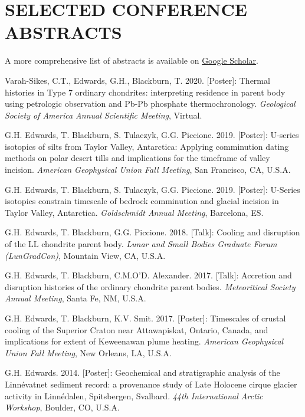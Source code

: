\documentclass[10pt]{article}
\begin{document}

\section*{SELECTED CONFERENCE ABSTRACTS}

\begin{center} A more comprehensive list of abstracts is available on \href{https://scholar.google.com/citations?user=KHLOvgcAAAAJ&hl=en}{Google Scholar}. \end{center}

\begin{etaremune} [itemsep=4pt, leftmargin=3ex]
  \item Varah-Sikes, C.T., Edwards, G.H., Blackburn, T. 2020. [Poster]: Thermal histories in Type 7 ordinary chondrites: interpreting residence in parent body using petrologic observation and Pb-Pb phosphate thermochronology. \textit{Geological Society of America Annual Scientific Meeting}, Virtual.
  \item G.H. Edwards, T. Blackburn, S. Tulaczyk, G.G. Piccione. 2019. [Poster]: U-series isotopics of silts from Taylor Valley, Antarctica: Applying comminution dating methods on polar desert tills and implications for the timeframe of valley incision. \textit{American Geophysical Union Fall Meeting}, San Francisco, CA, U.S.A.
  \item  G.H. Edwards, T. Blackburn, S. Tulaczyk, G.G. Piccione. 2019. [Poster]: U-Series isotopics constrain timescale of bedrock comminution and glacial incision in Taylor Valley, Antarctica. \textit{Goldschmidt Annual Meeting}, Barcelona, ES.
	\item  G.H. Edwards, T. Blackburn, G.G. Piccione. 2018. [Talk]: Cooling and disruption of the LL chondrite parent body. \textit{Lunar and Small Bodies Graduate Forum (LunGradCon)}, Mountain View, CA, U.S.A.
  \item  G.H. Edwards, T. Blackburn, C.M.O’D. Alexander. 2017. [Talk]: Accretion and disruption histories of the ordinary chondrite parent bodies. \textit{Meteoritical Society Annual Meeting}, Santa Fe, NM, U.S.A.
  \item G.H. Edwards, T. Blackburn, K.V. Smit. 2017. [Poster]: Timescales of crustal cooling of the Superior Craton near Attawapiskat, Ontario, Canada, and implications for extent of Keweenawan plume heating. \textit{American Geophysical Union Fall Meeting}, New Orleans, LA, U.S.A.
  \item G.H. Edwards. 2014. [Poster]: Geochemical and stratigraphic analysis of the Linnévatnet sediment record: a provenance study of Late Holocene cirque glacier activity in Linnédalen, Spitsbergen, Svalbard. \textit{44th International Arctic Workshop}, Boulder, CO, U.S.A.
\end{etaremune}
\vspace{-12pt}
\end{document}
